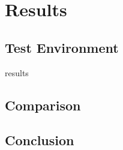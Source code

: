 \section{Results}

\subsection{Test Environment}

results

\subsection{Comparison}

\subsection{Conclusion}

\newpage
